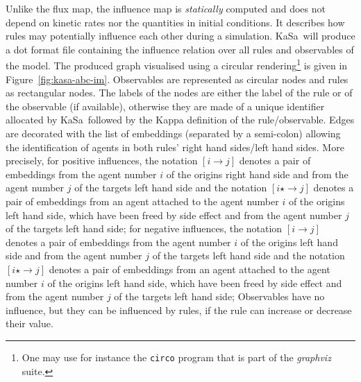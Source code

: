\documentclass[11pt]{book}
\def\KaSa{\textsf{KaSa}}
\def\ttt#1{\texttt{#1}}
\def\rar{\rightarrow}
\begin{document}
Unlike the flux map, the influence map is \emph{statically} computed and does not depend on kinetic rates nor the quantities in initial conditions. It describes how rules may potentially influence each other during a simulation. \KaSa~will produce a dot format file containing the influence relation over all rules and observables of the model. The produced graph visualised using a circular rendering\footnote{One may use for instance the \ttt{circo} program that is part of the \textit{graphviz} suite.} is given in Figure~\ref{fig:kasa-abc-im}. Observables are represented as circular nodes and rules as rectangular nodes. The labels of the nodes are either the label of the rule or of the observable (if available), otherwise they are made of a unique identifier allocated by \KaSa~followed by the Kappa definition of the rule/observable.
Edges are decorated with the list of embeddings (separated by a semi-colon) allowing the identification of agents in both rules' right hand sides/left hand sides.
More precisely, for positive influences,  the notation $[i\rar j]$ denotes a pair of embeddings from the agent number $i$ of the origin{\textquotesingle}s right hand side and from the agent number $j$ of the target{\textquotesingle}s left hand side and the notation $[i\star \rar j]$ denotes a pair of embeddings from an agent attached to the agent number $i$  of the origin{\textquotesingle}s left hand side, which have been freed by side effect  and   from the agent number $j$ of the target{\textquotesingle}s left hand side; for negative influences,  the notation $[i\rar j]$ denotes a pair of embeddings from the agent number $i$ of the origin{\textquotesingle}s left hand side and from the agent number $j$ of the target{\textquotesingle}s left hand side and the notation $[i\star \rar j]$ denotes a pair of embeddings from an agent attached to the agent number $i$  of the origin{\textquotesingle}s left hand side, which have been freed by side effect  and   from the agent number $j$ of the target{\textquotesingle}s left hand side;
 Observables have no influence, but they can be influenced by rules, if the rule can increase or decrease their value.
\end{document}
